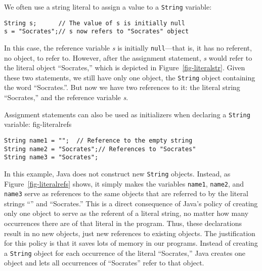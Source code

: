 We often use a string literal to assign a value to a {\tt String}
variable: 

\begin{jjjlisting}
\begin{lstlisting}
String s;      // The value of s is initially null
s = "Socrates";// s now refers to "Socrates" object
\end{lstlisting}
\end{jjjlisting}

\noindent In this case, the reference variable {\it s} is initially
{\tt null}---that is, it has no referent, no object, to refer to.
However, after the assignment statement, {\it s} would refer to the
literal object ``Socrates,'' which is depicted in Figure~\ref{fig-literalstr}. Given
these two statements, we still have only one object, the {\tt String}
object containing the word ``Socrates.''.  But now we have two
references to it: the literal string ``Socrates,'' and the reference
variable {\it s}.

Assignment statements can also be used as initializers when declaring
a {\tt String} variable:
{fig-literalrefs}


\begin{jjjlisting}
\begin{lstlisting}
String name1 = "";  // Reference to the empty string
String name2 = "Socrates";// References to "Socrates"
String name3 = "Socrates";
\end{lstlisting}
\end{jjjlisting}

\noindent In this example, Java does not construct new {\tt String}
objects.  Instead, as Figure~\ref{fig-literalrefs} shows, it simply makes the variables
{\tt name1}, {\tt name2}, and {\tt name3} serve as references to the
same objects that are referred to by the literal strings ``'' and
``Socrates.'' This is a direct consequence of Java's policy of
creating only one object to serve as the referent of a literal string,
no matter how many occurrences there are of that literal in the
program.  Thus, these declarations result in no new objects, just new
references to existing objects.  The justification for this policy is
that it saves lots of memory in our programs. Instead of creating a
{\tt String} object for each occurrence of the literal ``Socrates,''
Java creates one object and lets all occurrences of ``Socrates'' refer
to that object.

